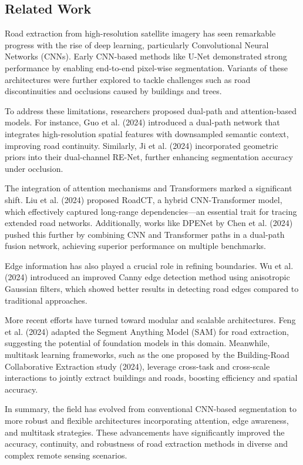 \documentclass[11pt]{article}
\begin{document}
\begin{multicols}{2}

\section{Related Work}
Road extraction from high-resolution satellite imagery has seen remarkable progress with the rise of deep learning, particularly Convolutional Neural Networks (CNNs). Early CNN-based methods like U-Net demonstrated strong performance by enabling end-to-end pixel-wise segmentation. Variants of these architectures were further explored to tackle challenges such as road discontinuities and occlusions caused by buildings and trees.

To address these limitations, researchers proposed dual-path and attention-based models. For instance, Guo et al. (2024) introduced a dual-path network that integrates high-resolution spatial features with downsampled semantic context, improving road continuity. Similarly, Ji et al. (2024) incorporated geometric priors into their dual-channel RE-Net, further enhancing segmentation accuracy under occlusion.

The integration of attention mechanisms and Transformers marked a significant shift. Liu et al. (2024) proposed RoadCT, a hybrid CNN-Transformer model, which effectively captured long-range dependencies—an essential trait for tracing extended road networks. Additionally, works like DPENet by Chen et al. (2024) pushed this further by combining CNN and Transformer paths in a dual-path fusion network, achieving superior performance on multiple benchmarks.

Edge information has also played a crucial role in refining boundaries. Wu et al. (2024) introduced an improved Canny edge detection method using anisotropic Gaussian filters, which showed better results in detecting road edges compared to traditional approaches.

More recent efforts have turned toward modular and scalable architectures. Feng et al. (2024) adapted the Segment Anything Model (SAM) for road extraction, suggesting the potential of foundation models in this domain. Meanwhile, multitask learning frameworks, such as the one proposed by the Building-Road Collaborative Extraction study (2024), leverage cross-task and cross-scale interactions to jointly extract buildings and roads, boosting efficiency and spatial accuracy.

In summary, the field has evolved from conventional CNN-based segmentation to more robust and flexible architectures incorporating attention, edge awareness, and multitask strategies. These advancements have significantly improved the accuracy, continuity, and robustness of road extraction methods in diverse and complex remote sensing scenarios.


\end{multicols}
\end{document}
